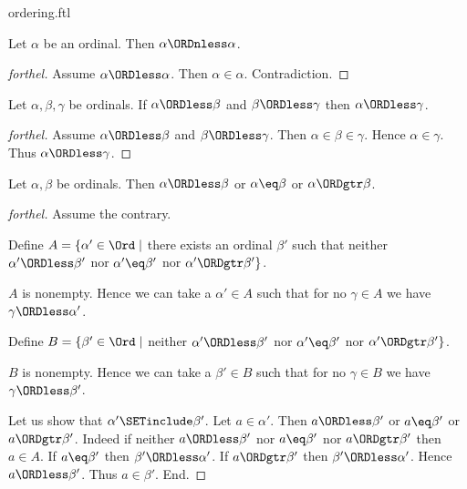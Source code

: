 \documentclass{naproche-library}
\begin{document}
\begin{smodule}[title=The Standard Ordering of the Ordinals]{ordering.ftl}
\begin{proposition}[forthel,id=SET_THEORY_02_6229364135952384]
  Let $\alpha$ be an ordinal.
  Then $\alpha \ORDnless \alpha$.
\end{proposition}
\begin{proof}[forthel]
  Assume $\alpha \ORDless \alpha$.
  Then $\alpha \in \alpha$.
  Contradiction.
\end{proof}

\begin{proposition}[forthel,id=SET_THEORY_02_7098683017396224]
  Let $\alpha, \beta, \gamma$ be ordinals.
  If $\alpha \ORDless \beta$ and $\beta \ORDless \gamma$ then $\alpha \ORDless \gamma$.
\end{proposition}
\begin{proof}[forthel]
  Assume $\alpha \ORDless \beta$ and $\beta \ORDless \gamma$.
  Then $\alpha \in \beta \in \gamma$.
  Hence $\alpha \in \gamma$.
  Thus $\alpha \ORDless \gamma$.
\end{proof}

\begin{proposition}[forthel,id=SET_THEORY_02_1718825707896832]
  Let $\alpha, \beta$ be ordinals.
  Then $\alpha \ORDless \beta$ or $\alpha \eq \beta$ or $\alpha \ORDgtr \beta$.
\end{proposition}
\begin{proof}[forthel]
  Assume the contrary.
  
  Define $A = \{ \alpha' \in \Ord \mid$ there exists an ordinal $\beta'$ such that neither $\alpha' \ORDless \beta'$ nor $\alpha' \eq \beta'$ nor $\alpha' \ORDgtr \beta' \}$.
  
  $A$ is nonempty.
  Hence we can take a $\alpha' \in A$ such that for no $\gamma \in A$ we have $\gamma \ORDless \alpha'$.
  
  Define $B = \{ \beta' \in \Ord \mid$ neither $\alpha' \ORDless \beta'$ nor $\alpha' \eq \beta'$ nor $\alpha' \ORDgtr \beta' \}$.
  
  $B$ is nonempty.
  Hence we can take a $\beta' \in B$ such that for no $\gamma \in B$ we have $\gamma \ORDless \beta'$.

  Let us show that $\alpha' \SETinclude \beta'$.
    Let $a \in \alpha'$.
    Then $a \ORDless \beta'$ or $a \eq \beta'$ or $a \ORDgtr \beta'$.
    Indeed if neither $a \ORDless \beta'$ nor $a \eq \beta'$ nor $a \ORDgtr \beta'$ then
    $a \in A$.
    If $a \eq \beta'$ then $\beta' \ORDless \alpha'$.
    If $a \ORDgtr \beta'$ then $\beta' \ORDless \alpha'$.
    Hence $a \ORDless \beta'$.
    Thus $a \in \beta'$.
  End.


\end{proof}
\end{smodule}
\end{document}
